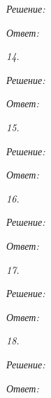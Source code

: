 \vspace*{2em}
\emph{Решение:}

\vspace*{2em}
\emph{Ответ: }


\emph{14.}

\vspace*{2em}
\emph{Решение:}

\vspace*{2em}
\emph{Ответ: }


\emph{15.}

\vspace*{2em}
\emph{Решение:}

\vspace*{2em}
\emph{Ответ: }


\emph{16.}

\vspace*{2em}
\emph{Решение:}

\vspace*{2em}
\emph{Ответ: }


\emph{17.}

\vspace*{2em}
\emph{Решение:}

\vspace*{2em}
\emph{Ответ: }


\emph{18.}

\vspace*{2em}
\emph{Решение:}

\vspace*{2em}
\emph{Ответ: }



